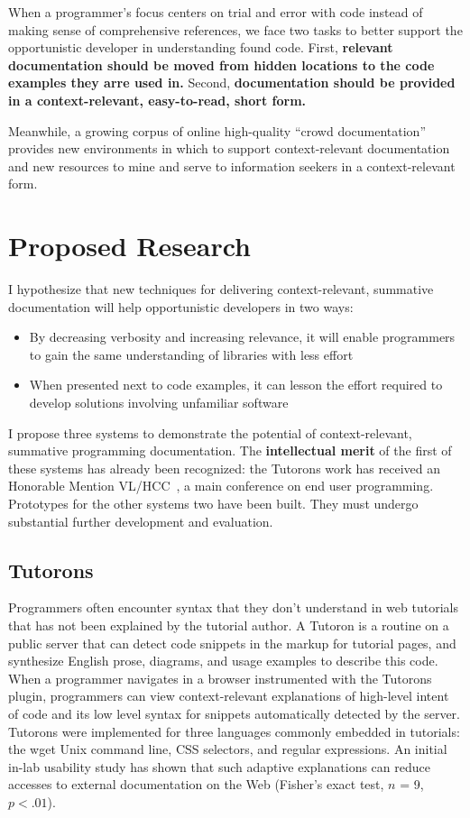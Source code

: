 \documentclass[12pt]{memoir}
\begin{document}
When a programmer's focus centers on trial and error with code instead of making sense of comprehensive references, we face two tasks to better support the opportunistic developer in understanding found code.
First, \textbf{relevant documentation should be moved from hidden locations to the code examples they arre used in.}
Second, \textbf{documentation should be provided in a context-relevant, easy-to-read, short form.}

Meanwhile, a growing corpus of online high-quality ``crowd documentation''~\cite{parnin_crowd_2012} provides new environments in which to support context-relevant documentation and new resources to mine and serve to information seekers in a context-relevant form.

\section{Proposed Research}

I hypothesize that new techniques for delivering context-relevant, summative documentation will help opportunistic developers in two ways:
\begin{itemize}[noitemsep,topsep=0pt]
\item By decreasing verbosity and increasing relevance, it will enable programmers to gain the same understanding of libraries with less effort
\item When presented next to code examples, it can lesson the effort required to develop solutions involving unfamiliar software
\end{itemize}

I propose three systems to demonstrate the potential of context-relevant, summative programming documentation.
The \textbf{intellectual merit} of the first of these systems has already been recognized:
the Tutorons work has received an Honorable Mention VL/HCC~\cite{head_tutorons_2015}, a main conference on end user programming.
Prototypes for the other systems two have been built.
They must undergo substantial further development and evaluation.

\subsection{Tutorons}
Programmers often encounter syntax that they don't understand in web tutorials that has not been explained by the tutorial author.
A Tutoron is a routine on a public server that can detect code snippets in the markup for tutorial pages, and synthesize English prose, diagrams, and usage examples to describe this code.
When a programmer navigates in a browser instrumented with the Tutorons plugin, programmers can view context-relevant explanations of high-level intent of code and its low level syntax for snippets automatically detected by the server.
Tutorons were implemented for three languages commonly embedded in tutorials: the wget Unix command line, CSS selectors, and regular expressions.
An initial in-lab usability study has shown that such adaptive explanations can reduce accesses to external documentation on the Web (Fisher's exact test, $n$ = 9, $p<.01$).
\end{document}
